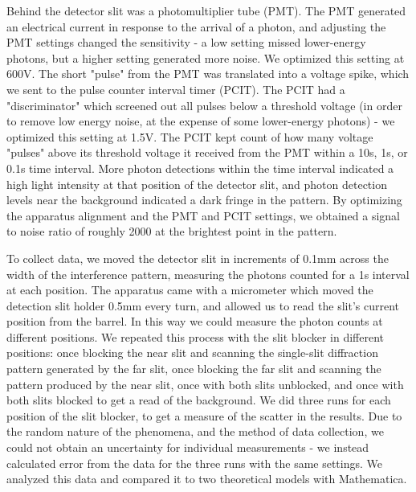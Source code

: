 \documentclass[prb,preprint]{revtex4-1}
\begin{document}
Behind the detector slit was a photomultiplier tube (PMT).  The PMT generated an electrical current in response to the arrival of a photon, and adjusting the PMT settings changed the sensitivity - a low setting missed lower-energy photons, but a higher setting generated more noise.  We optimized this setting at 600V.  The short "pulse" from the PMT was translated into a voltage spike, which we sent to the pulse counter interval timer (PCIT).  The PCIT had a "discriminator" which screened out all pulses below a threshold voltage (in order to remove low energy noise, at the expense of some lower-energy photons) - we optimized this setting at 1.5V. The PCIT kept count of how many voltage "pulses" above its threshold voltage it received from the PMT within a 10s, 1s, or 0.1s time interval. More photon detections within the time interval indicated a high light intensity at that position of the detector slit, and photon detection levels near the background indicated a dark fringe in the pattern. By optimizing the apparatus alignment and the PMT and PCIT settings, we obtained a signal to noise ratio of roughly 2000 at the brightest point in the pattern.  

To collect data, we moved the detector slit in increments of 0.1mm across the width of the interference pattern, measuring the photons counted for a 1s interval at each position.  The apparatus came with a micrometer which moved the detection slit holder 0.5mm every turn, and allowed us to read the slit's current position from the barrel.  In this way we could measure the photon counts at different positions.  We repeated this process with the slit blocker in different positions: once blocking the near slit and scanning the single-slit diffraction pattern generated by the far slit, once blocking the far slit and scanning the pattern produced by the near slit, once with both slits unblocked, and once with both slits blocked to get a read of the background.  We did three runs for each position of the slit blocker, to get a measure of the scatter in the results.  Due to the random nature of the phenomena, and the method of data collection, we could not obtain an uncertainty for individual measurements - we instead calculated error from the data for the three runs with the same settings.  We analyzed this data and compared it to two theoretical models with Mathematica.  
\end{document}
